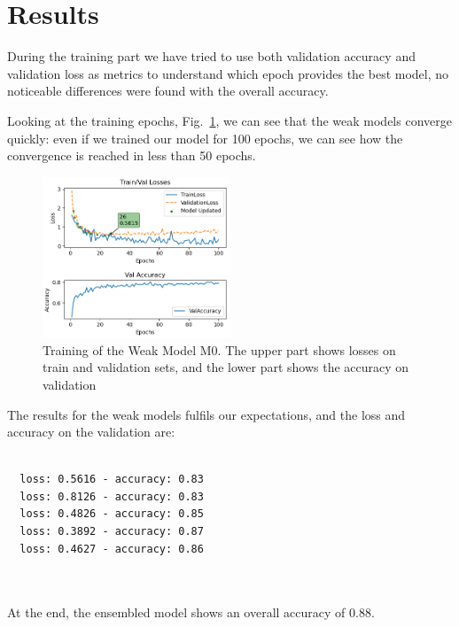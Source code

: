 \section{Results}
\label{sec:results}
During the training part we have tried to use both validation accuracy and validation loss as metrics to understand which epoch provides the best model, no noticeable differences were found with the overall accuracy.

Looking at the training epochs, Fig.~\ref{fig:trainingPlot}, we can see that the weak models converge quickly: even if we trained our model for 100 epochs, we can see how the convergence is reached in less than 50 epochs.

\begin{figure}[h]
\begin{center}
        \centering
        \includegraphics[width=0.5\textwidth]{resources/training_m0.png}
        \caption{Training of the Weak Model M0. The upper part shows losses on train and validation sets, and the lower part shows the accuracy on validation}
        \label{fig:trainingPlot}
    \end{center}
\end{figure}

The results for the weak models fulfils our expectations, and the loss and accuracy on the validation are:

\begin{minipage}{\textwidth}

\begin{verbatim}

  loss: 0.5616 - accuracy: 0.83 
  loss: 0.8126 - accuracy: 0.83
  loss: 0.4826 - accuracy: 0.85
  loss: 0.3892 - accuracy: 0.87
  loss: 0.4627 - accuracy: 0.86
  
\end{verbatim}
\end{minipage}
\\
At the end, the ensembled model shows an overall accuracy of 0.88.

